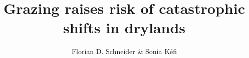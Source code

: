 \documentclass[a4paper, twoside, BCOR20mm, DIV14, headinclude, 11pt, headings=optiontohead]{scrartcl}
\begin{document}
%


\title{Grazing raises risk of catastrophic shifts in drylands}
\author{Florian D. Schneider \& Sonia K\'efi}
\date{}
\maketitle

 

%
\end{document}
